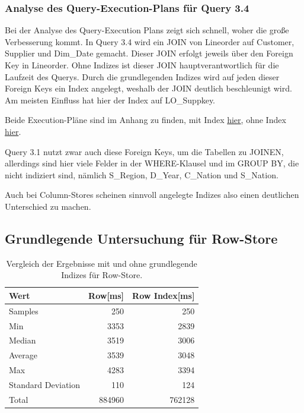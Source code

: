 \subsubsection{Analyse des Query-Execution-Plans für Query 3.4}

Bei der Analyse des Query-Execution Plans zeigt sich schnell, woher die große Verbesserung kommt. In Query 3.4 wird ein JOIN von Lineorder auf Customer, Supplier und Dim\_Date gemacht. 
Dieser JOIN erfolgt jeweils über den Foreign Key in Lineorder. Ohne Indizes ist dieser JOIN hauptverantwortlich für die Laufzeit des Querys.
Durch die grundlegenden Indizes wird auf jeden dieser Foreign Keys ein Index angelegt, weshalb der JOIN deutlich beschleunigt wird. Am meisten Einfluss hat hier der Index auf LO\_Suppkey.

Beide Execution-Pläne sind im Anhang zu finden, mit Index \hyperlink{q34I.1}{hier}, ohne Index \hyperlink{q34noI.1}{hier}. 

Query 3.1 nutzt zwar auch diese Foreign Keys, um die Tabellen zu JOINEN, allerdings sind hier viele Felder in der WHERE-Klausel und im GROUP BY, die nicht indiziert sind, nämlich S\_Region, D\_Year, C\_Nation und S\_Nation.

Auch bei Column-Stores scheinen sinnvoll angelegte Indizes also einen deutlichen Unterschied zu machen. 


\subsection{Grundlegende Untersuchung für Row-Store}

\begin{table}[!ht]
    \begin{tabularx}{10cm}{l|rr}
        \toprule
        Wert                & Row[ms] & Row Index[ms]\\
        \toprule
        Samples             & 250      & 250\\
        Min                 & 3353     & 2839\\
        Median              & 3519     & 3006\\
        Average             & 3539     & 3048\\
        Max                 & 4283     & 3394\\
        Standard Deviation  & 110      & 124\\
        Total               & 884960   & 762128\\ 
    \end{tabularx}
\caption{Vergleich der Ergebnisse mit und ohne grundlegende Indizes für Row-Store.}
\label{tab:basic_index_row}
\end{table}



